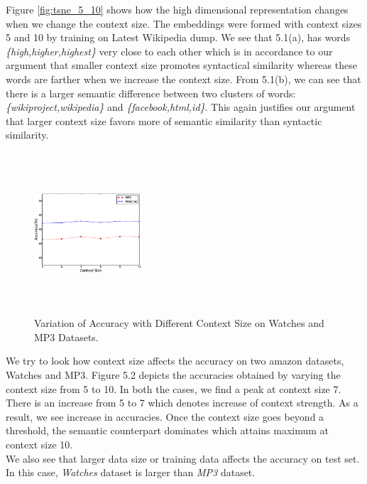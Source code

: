 \documentclass[11pt,a4paper]{article}
\begin{document}
Figure \ref{fig:tsne_5_10} shows how the high dimensional representation changes when we change the context size. The embeddings were formed with context sizes 5 and 10 by training on Latest Wikipedia dump. We see that 5.1(a), has words \emph{\{high,higher,highest\}} very close to each other which is in accordance to our argument that smaller context size promotes syntactical similarity whereas these words are farther when we increase the context size. From 5.1(b), we can see that there is a larger semantic difference between two clusters of words:\emph{\{wikiproject,wikipedia\}} and \emph{\{facebook,html,id\}}. This again justifies our argument that larger context size favors more of semantic similarity than syntactic similarity.

\begin{figure}[ht!]
\centering
\includegraphics[width=40mm, height=60mm]{img/context_size.eps}
\caption{Variation of Accuracy with Different Context Size on Watches and MP3 Datasets. \label{fig:context_size}}
\end{figure}
We try to look how context size affects the accuracy on two amazon datasets, Watches and MP3.
Figure 5.2 depicts the accuracies obtained by varying the context size from 5 to 10. In both the cases, we find a peak at context size 7. There is an increase from 5 to 7 which denotes increase of context strength. As a result, we see increase in accuracies. Once the context size goes beyond a threshold, the semantic counterpart dominates which attains maximum at context size 10.\\
We also see that larger data size or training data affects the accuracy on test set. In this case, \emph{Watches} dataset is larger than \emph{MP3} dataset.\\
\end{document}
